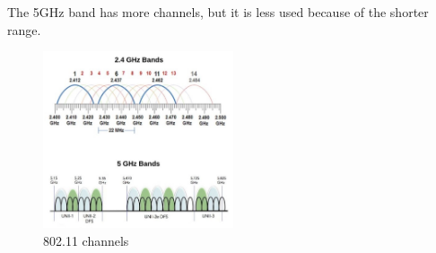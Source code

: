 The 5GHz band has more channels, but it is less used because of the shorter range.
\begin{figure}
  \centering
  \includegraphics[width=0.5\textwidth]{img/wireless/80211 channels.png}
  \caption{802.11 channels}
\end{figure}
